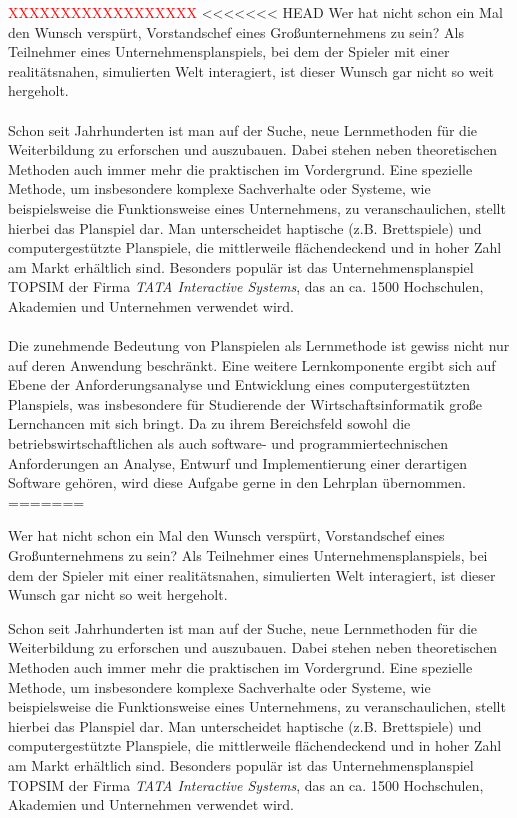 {\huge \textcolor{red}{XXXXXXXXXXXXXXXXXX}}
<<<<<<< HEAD
Wer hat nicht schon ein Mal den Wunsch verspürt, Vorstandschef eines Großunternehmens zu sein? 
Als Teilnehmer eines Unternehmensplanspiels, bei dem der Spieler mit  einer realitätsnahen, simulierten Welt interagiert, ist dieser Wunsch gar nicht so weit hergeholt. 
\\
\\
Schon seit Jahrhunderten ist man auf der Suche, neue Lernmethoden für die Weiterbildung zu erforschen und auszubauen. Dabei stehen neben theoretischen Methoden auch immer mehr die praktischen im Vordergrund.  Eine spezielle Methode, um insbesondere komplexe Sachverhalte oder Systeme, wie beispielsweise die Funktionsweise eines Unternehmens, zu veranschaulichen, stellt hierbei das Planspiel dar. Man unterscheidet haptische (z.B. Brettspiele) und computergestützte Planspiele, die mittlerweile flächendeckend und in hoher Zahl am Markt erhältlich sind. Besonders populär ist das Unternehmensplanspiel TOPSIM der Firma \textit{TATA Interactive Systems}, das an ca. 1500 Hochschulen, Akademien und Unternehmen verwendet wird.
\\
\\
Die zunehmende Bedeutung von Planspielen als Lernmethode ist gewiss nicht nur auf deren Anwendung beschränkt. Eine weitere Lernkomponente ergibt sich auf Ebene der Anforderungsanalyse und Entwicklung eines computergestützten Planspiels, was insbesondere für Studierende der Wirtschaftsinformatik große Lernchancen mit sich bringt. Da zu ihrem Bereichsfeld sowohl die betriebswirtschaftlichen als auch software- und programmiertechnischen Anforderungen an Analyse, Entwurf und Implementierung einer derartigen Software gehören, wird diese Aufgabe gerne in den Lehrplan übernommen. 
=======

Wer hat nicht schon ein Mal den Wunsch verspürt, Vorstandschef eines Großunternehmens zu sein? 
Als Teilnehmer eines Unternehmensplanspiels, bei dem der Spieler mit  einer realitätsnahen, simulierten Welt interagiert, ist dieser Wunsch gar nicht so weit hergeholt. 

Schon seit Jahrhunderten ist man auf der Suche, neue Lernmethoden für die Weiterbildung zu erforschen und auszubauen. Dabei stehen neben theoretischen Methoden auch immer mehr die praktischen im Vordergrund.  Eine spezielle Methode, um insbesondere komplexe Sachverhalte oder Systeme, wie beispielsweise die Funktionsweise eines Unternehmens, zu veranschaulichen, stellt hierbei das Planspiel dar. Man unterscheidet haptische (z.B. Brettspiele) und computergestützte Planspiele, die mittlerweile flächendeckend und in hoher Zahl am Markt erhältlich sind. Besonders populär ist das Unternehmensplanspiel TOPSIM der Firma \textit{TATA Interactive Systems}, das an ca. 1500 Hochschulen, Akademien und Unternehmen verwendet wird. 

